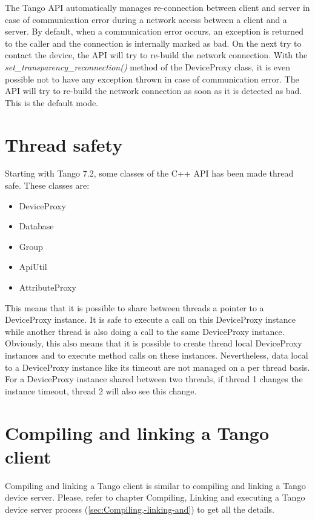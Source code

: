 The Tango API automatically manages re-connection between client and
server in case of communication error during a network access between
a client and a server. By default, when a communication error occurs,
an exception is returned to the caller and the connection is internally
marked as bad. On the next try to contact the device, the API will
try to re-build the network connection. With the \emph{set\_transparency\_reconnection()}
method of the DeviceProxy class, it is even possible
not to have any exception thrown in case of communication error. The
API will try to re-build the network connection as soon as it is detected
as bad. This is the default mode.

\section{Thread safety}

Starting with Tango 7.2, some classes of the C++ API has been made
thread safe. These classes are:
\begin{itemize}
\item DeviceProxy
\item Database
\item Group
\item ApiUtil
\item AttributeProxy
\end{itemize}
This means that it is possible to share between threads a pointer
to a DeviceProxy instance. It is safe to execute a call on this DeviceProxy
instance while another thread is also doing a call to the same DeviceProxy
instance. Obviously, this also means that it is possible to create
thread local DeviceProxy instances and to execute method calls on
these instances. Nevertheless, data local to a DeviceProxy instance
like its timeout are not managed on a per thread basis. For a DeviceProxy
instance shared between two threads, if thread 1 changes the instance
timeout, thread 2 will also see this change.


\section{Compiling and linking a Tango client}

Compiling and linking a Tango client is similar to compiling and linking
a Tango device server. Please, refer to chapter \textquotedbl{}Compiling,
Linking and executing a Tango device server process\textquotedbl{}
(\ref{sec:Compiling,-linking-and}) to get all the details.

